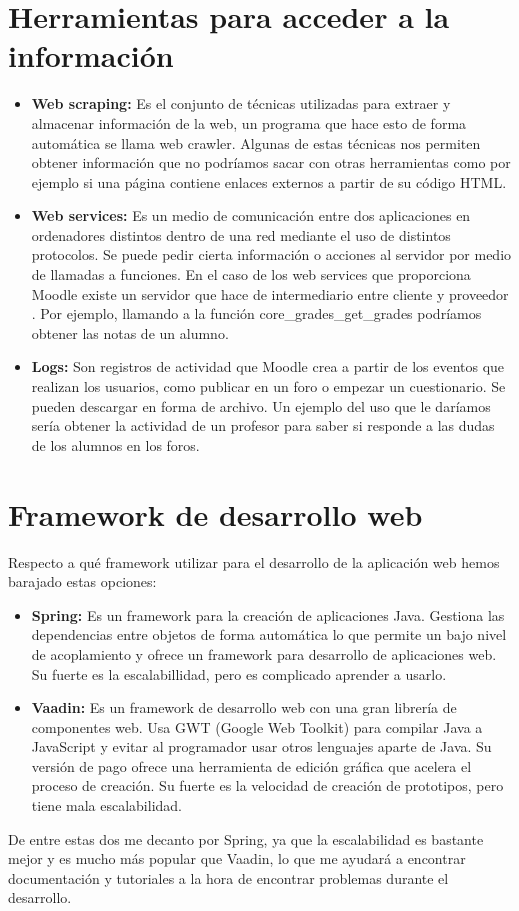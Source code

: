  
 
\section{Herramientas para acceder a la información}
\begin{itemize}
	\item \textbf{Web scraping:}
	Es el conjunto de técnicas utilizadas para extraer y almacenar información de la web, un programa que hace esto de forma automática se llama web crawler. Algunas de estas técnicas nos permiten obtener información que no podríamos sacar con otras herramientas como por ejemplo si una página contiene enlaces externos a partir de su código HTML.
	\item \textbf{Web services:}
	Es un medio de comunicación entre dos aplicaciones en ordenadores distintos dentro de una red mediante el uso de distintos protocolos. Se puede pedir cierta información o acciones al servidor por medio de llamadas a funciones. En el caso de los web services que proporciona Moodle existe un servidor que hace de intermediario entre cliente y proveedor \cite{moodle-2020}. Por ejemplo, llamando a la función core\_grades\_get\_grades podríamos obtener las notas de un alumno.
	\item \textbf{Logs:}
	Son registros de actividad que Moodle crea a partir de los eventos que realizan los usuarios, como publicar en un foro o empezar un cuestionario. Se pueden descargar en forma de archivo. Un ejemplo del uso que le daríamos sería obtener la actividad de un profesor para saber si responde a las dudas de los alumnos en los foros.
\end{itemize}
\section{Framework de desarrollo web}
Respecto a qué framework utilizar para el desarrollo de la aplicación web hemos barajado estas opciones:
\begin{itemize}
	\item \textbf{Spring:}
	Es un framework para la creación de aplicaciones Java. Gestiona las dependencias entre objetos de forma automática lo que permite un bajo nivel de acoplamiento y ofrece un framework para desarrollo de aplicaciones web. Su fuerte es la escalabillidad, pero es complicado aprender a usarlo.
	\item \textbf{Vaadin:}
	Es un framework de desarrollo web con una gran librería de componentes web. Usa GWT (Google Web Toolkit) para compilar Java a JavaScript y evitar al programador usar otros lenguajes aparte de Java. Su versión de pago ofrece una herramienta de edición gráfica que acelera el proceso de creación. Su fuerte es la velocidad de creación de prototipos, pero tiene mala escalabilidad.
\end{itemize}

De entre estas dos me decanto por Spring, ya que la escalabilidad es bastante mejor y es mucho más popular que Vaadin, lo que me ayudará a encontrar documentación y tutoriales a la hora de encontrar problemas durante el desarrollo.
